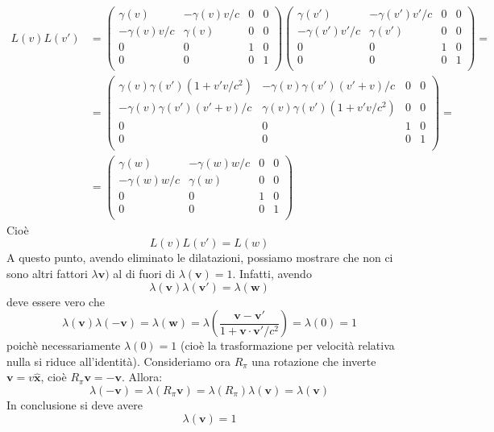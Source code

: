 \documentclass[a4paper,11pt]{book}
\theoremstyle{plain}
\theoremstyle{definition}
\begin{document}
\begin{align*}
L(v)L(v')&=
\left(
\begin{array}{cccc}
\gamma(v) & -\gamma(v) v/c & 0 & 0 \\
-\gamma(v) v/c & \gamma(v) & 0 & 0 \\
0 & 0 & 1 & 0 \\
0 & 0 & 0 & 1 \\
\end{array} \right)
\left(
\begin{array}{cccc}
\gamma(v') & -\gamma(v') v'/c & 0 & 0 \\
-\gamma(v') v'/c & \gamma(v') & 0 & 0 \\
0 & 0 & 1 & 0 \\
0 & 0 & 0 & 1 \\
\end{array} \right)= \\
&=\left( \begin{array}{cccc}
\gamma(v)\gamma(v')(1+v'v/c^2) & -\gamma(v)\gamma(v') (v'+v)/c & 0 & 0 \\
-\gamma(v)\gamma(v') (v'+v)/c & \gamma(v)\gamma(v')(1+v'v/c^2) & 0 & 0 \\
0 & 0 & 1 & 0 \\
0 & 0 & 0 & 1 \\
\end{array} \right)=\\
&=\left(
\begin{array}{cccc}
\gamma(w) & -\gamma(w) w/c & 0 & 0 \\
-\gamma(w) w/c & \gamma(w) & 0 & 0 \\
0 & 0 & 1 & 0 \\
0 & 0 & 0 & 1 \\
\end{array} \right)
\end{align*}
Cioè
\[
L(v)L(v')=L(w)
\]
A questo punto, avendo eliminato le dilatazioni, possiamo mostrare che non ci sono altri fattori $\lambda\textbf{v})$ al di fuori di $\lambda(\textbf{v})=1$. Infatti, avendo 
\[
\lambda(\textbf{v})\lambda(\textbf{v}')=\lambda(\textbf{w})
\]
deve essere vero che
\[
\lambda(\textbf{v})\lambda(-\textbf{v})=\lambda(\textbf{w})=\lambda\left(\frac{\textbf{v}-\textbf{v}'}{1+\textbf{v}\cdot\textbf{v}'/c^2}\right)=\lambda(0)=1
\]
poichè necessariamente $\lambda(0)=1$ (cioè la trasformazione per velocità relativa nulla si riduce all'identità). Consideriamo ora $R_{\pi}$ una rotazione che inverte $\textbf{v}=v\hat{\textbf{x}}$, cioè $R_{\pi}\textbf{v}=-\textbf{v}$. Allora:
\[
\lambda(-\textbf{v})=\lambda(R_{\pi}\textbf{v})=\lambda(R_{\pi})\lambda(\textbf{v})=\lambda(\textbf{v})
\]
In conclusione si deve avere
\[
\lambda(\textbf{v})=1
\]
\end{document}
